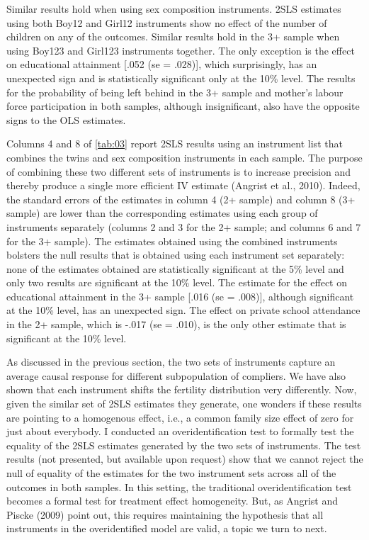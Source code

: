 Similar results hold when using sex composition instruments. 2SLS estimates using both Boy12 and Girl12 instruments show no effect of the number of children on any of the outcomes. Similar results hold in the 3+ sample when using Boy123 and Girl123 instruments together. The only exception is the effect on educational attainment [.052 (se = .028)], which surprisingly, has an unexpected sign and is statistically significant only at the 10\% level. The results for the probability of being left behind in the 3+ sample and mother’s labour force participation in both samples, although insignificant, also have the opposite signs to the OLS estimates.

Columns 4 and 8 of \autoref{tab:03} report 2SLS results using an instrument list that combines the twins and sex composition instruments in each sample. The purpose of combining these two different sets of instruments is to increase precision and thereby produce a single more efficient IV estimate (Angrist et al., 2010). Indeed, the standard errors of the estimates in column 4 (2+ sample) and column 8 (3+ sample) are lower than the corresponding estimates using each group of instruments separately (columns 2 and 3 for the 2+ sample; and columns 6 and 7 for the 3+ sample). The estimates obtained using the combined instruments bolsters the null results that is obtained using each instrument set separately: none of the estimates obtained are statistically significant at the 5\% level and only two results are significant at the 10\% level. The estimate for the effect on educational attainment in the 3+ sample [.016 (se = .008)], although significant at the 10\% level, has an unexpected sign. The effect on private school attendance in the 2+ sample, which is -.017 (se = .010), is the only other estimate that is significant at the 10\% level.

As discussed in the previous section, the two sets of instruments capture an average causal response for different subpopulation of compliers. We have also shown that each instrument shifts the fertility distribution very differently. Now, given the similar set of 2SLS estimates they generate, one wonders if these results are pointing to a homogenous effect, i.e., a common family size effect of zero for just about everybody. I conducted an overidentification test to formally test the equality of the 2SLS estimates generated by the two sets of instruments. The test results (not presented, but available upon request) show that we cannot reject the null of equality of the estimates for the two instrument sets across all of the outcomes in both samples. In this setting, the traditional overidentification test becomes a formal test for treatment effect homogeneity.  But, as Angrist and Piscke (2009) point out, this requires maintaining the hypothesis that all instruments in the overidentified model are valid, a topic we turn to next.
